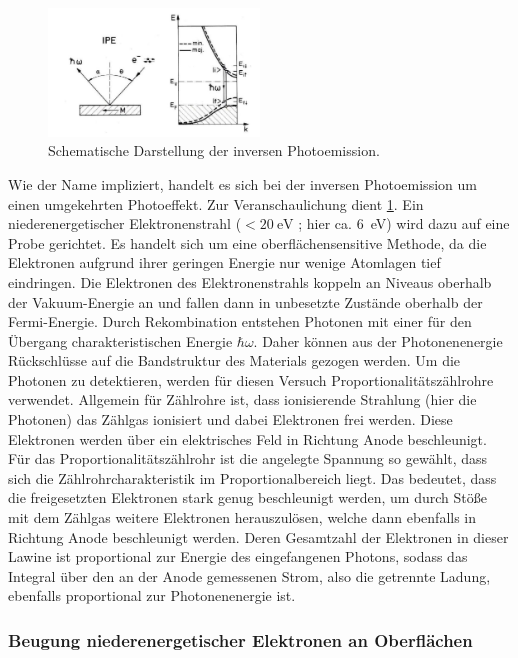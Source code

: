 \begin{figure}[!ht]
    \centering
    \includegraphics[width=0.5\textwidth]{img/ipe_theo.png}
    \caption{Schematische Darstellung der inversen Photoemission.\cite{donath}}
    \label{fig_ipe_theo}
\end{figure}
Wie der Name impliziert, handelt es sich bei der inversen Photoemission um einen umgekehrten Photoeffekt.
Zur Veranschaulichung dient \cref{fig_ipe_theo}.
Ein niederenergetischer Elektronenstrahl ($<\SI{20}{\electronvolt}$ \cite{wiki_ipe}; hier ca. \SI{6}{\electronvolt}) wird dazu auf eine Probe gerichtet.
Es handelt sich um eine oberflächensensitive Methode, da die Elektronen aufgrund ihrer geringen Energie nur wenige Atomlagen tief eindringen.
Die Elektronen des Elektronenstrahls koppeln an Niveaus oberhalb der Vakuum-Energie an und fallen dann in unbesetzte Zustände oberhalb der Fermi-Energie.
Durch Rekombination entstehen Photonen mit einer für den Übergang charakteristischen Energie $\hbar\omega$.
Daher können aus der Photonenenergie Rückschlüsse auf die Bandstruktur des Materials gezogen werden.
Um die Photonen zu detektieren, werden für diesen Versuch Proportionalitätszählrohre verwendet.
Allgemein für Zählrohre ist, dass ionisierende Strahlung (hier die Photonen) das Zählgas ionisiert und dabei Elektronen frei werden.
Diese Elektronen werden über ein elektrisches Feld in Richtung Anode beschleunigt.
Für das Proportionalitätszählrohr ist die angelegte Spannung so gewählt, dass sich die Zählrohrcharakteristik im Proportionalbereich liegt.
Das bedeutet, dass die freigesetzten Elektronen stark genug beschleunigt werden, um durch Stöße mit dem Zählgas weitere Elektronen herauszulösen, welche dann ebenfalls in Richtung Anode beschleunigt werden.
Deren Gesamtzahl der Elektronen in dieser Lawine ist proportional zur Energie des eingefangenen Photons, sodass das Integral über den an der Anode gemessenen Strom, also die getrennte Ladung, ebenfalls proportional zur Photonenenergie ist.

\subsubsection{Beugung niederenergetischer Elektronen an Oberflächen}

